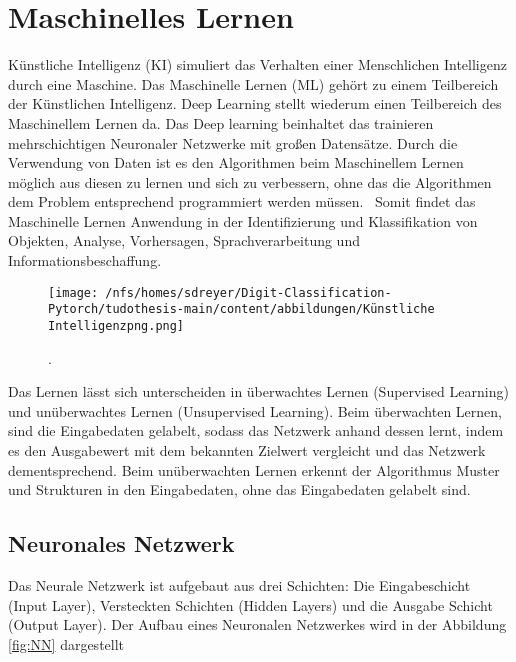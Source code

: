 \section{Maschinelles Lernen}

Künstliche Intelligenz (KI) simuliert das Verhalten einer Menschlichen Intelligenz durch eine Maschine. 
Das Maschinelle Lernen (ML) gehört zu einem Teilbereich der Künstlichen Intelligenz. Deep Learning stellt 
wiederum einen Teilbereich des Maschinellem Lernen da. Das Deep learning beinhaltet das trainieren mehrschichtigen Neuronaler Netzwerke mit großen Datensätze.
Durch die Verwendung von Daten ist es den Algorithmen beim 
Maschinellem Lernen möglich aus diesen zu lernen und sich zu verbessern, ohne das die Algorithmen dem Problem entsprechend programmiert werden müssen.~\cite{kleesiek2020}
Somit findet das Maschinelle Lernen Anwendung in der Identifizierung und Klassifikation von Objekten, Analyse, Vorhersagen, 
Sprachverarbeitung und Informationsbeschaffung.~\cite{shinde2018}

\begin{figure}[htbp]
  \centering
  \texttt{[image: /nfs/homes/sdreyer/Digit-Classification-Pytorch/tudothesis-main/content/abbildungen/Künstliche Intelligenzpng.png]}
  \caption{.~\cite{kleesiek2020}}
  \label{fig:KI}
\end{figure}

Das Lernen lässt sich unterscheiden in überwachtes Lernen (Supervised Learning) und unüberwachtes Lernen (Unsupervised Learning).
Beim überwachten Lernen, sind die Eingabedaten gelabelt, sodass das Netzwerk anhand dessen lernt, indem es den Ausgabewert mit dem bekannten Zielwert 
vergleicht und das Netzwerk dementsprechend.
Beim unüberwachten Lernen erkennt der Algorithmus Muster und Strukturen in den Eingabedaten, ohne das Eingabedaten gelabelt sind.~\cite{kleesiek2020}


\subsection{Neuronales Netzwerk}

Das Neurale Netzwerk ist aufgebaut aus drei Schichten: 
Die Eingabeschicht (Input Layer), Versteckten Schichten (Hidden Layers) und die Ausgabe Schicht (Output Layer).
Der Aufbau eines Neuronalen Netzwerkes wird in der Abbildung \ref{fig:NN} dargestellt

